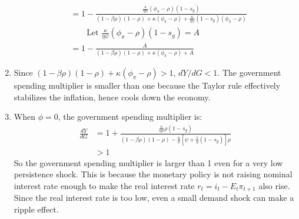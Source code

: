 \documentclass[11pt]{amsart}
\begin{document}
\begin{enumerate}[label = (\alph*)]
\begin{align*}
	& = 1 - \frac {  \frac { \kappa } { \eta \psi } \left( \phi _ { \pi } - \rho \right) (1-s _ { g }) } { \left( 1 -  \beta \rho \right) ( 1- \rho ) + \kappa(\phi_\pi - \rho) + \frac { \kappa } { \eta \psi } \left( 1- s _ { g } \right)  \left( \phi _ { \pi } - \rho \right) } \\
	& \qquad \text{Let } \frac { \kappa } { \eta \psi } \left( \phi _ { \pi } - \rho \right) (1-s _ { g }) = A \\
	& = 1 - \frac{A}{\left( 1 -  \beta \rho \right) ( 1- \rho ) + \kappa(\phi_\pi - \rho) + A} 
	\end{align*}
	\item Since $\left( 1 -  \beta \rho \right) ( 1- \rho ) + \kappa(\phi_\pi - \rho) >1$, $	dY / dG  < 1$. The government spending multiplier is smaller than one because the Taylor rule effectively stabilizes the inflation, hence cools down the economy.
	\item When $\phi = 0$, the government spending multiplier is:
	\begin{align*}
	\frac{d Y}{d G} &=  1 + \frac{\frac{\kappa}{\eta \phi} \rho(1-s_g)}{(1-\beta \rho)(1-\rho) - \frac{\kappa}{\psi} \left[ \psi + \frac{1}{\eta} (1-s_g) \right] \rho } \\
	& > 1
	\end{align*}
	So the government spending multiplier is larger than 1 even for a very low persistence shock. This is because the monetary policy is not raising nominal interest rate enough to make the real interest rate $r_t = i_t - E_t \pi_{t+1}$ also rise. Since the real interest rate is too low, even a small demand shock can make a ripple effect. 
	

\end{enumerate}
\end{document}
